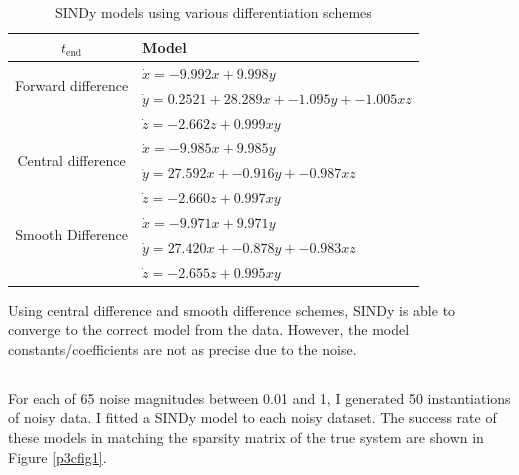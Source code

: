 \documentclass[11pt]{article}
\begin{document}
\subsection{} %

\begin{table}[H]
    \centering
    \caption{SINDy models using various differentiation schemes}
    \label{p3ctab1}
    \begin{tabular}{|c|l|}
        \hline
        $t_{\text{end}}$ & Model \\
        \hline
        \hline
        \multirow{2}{*}{Forward difference} & $\dot{x} = -9.992 x + 9.998 y$ \\
                            & $\dot{y} = 0.252 1 + 28.289 x + -1.095 y + -1.005 x z$ \\
                            & $\dot{z} = -2.662 z + 0.999 x y$ \\
        \hline
        \multirow{2}{*}{Central difference} & $\dot{x} = -9.985 x + 9.985 y$ \\
                            & $\dot{y} = 27.592 x + -0.916 y + -0.987 x z$ \\
                            & $\dot{z} = -2.660 z + 0.997 x y$ \\
        \hline
        \multirow{2}{*}{Smooth Difference} & $\dot{x} = -9.971 x + 9.971 y$ \\
                            & $\dot{y} = 27.420 x + -0.878 y + -0.983 x z$ \\
                            & $\dot{z} = -2.655 z + 0.995 x y$ \\
        \hline
    \end{tabular}
\end{table}

Using central difference and smooth difference schemes, SINDy  is able to converge to the correct model from the data. However, the model constants/coefficients are not as precise due to the noise.

\subsection{} %

For each of 65 noise magnitudes between 0.01 and 1, I generated 50 instantiations of noisy data. I fitted a SINDy model to each noisy dataset. The success rate of these models in matching the sparsity matrix of the true system are shown in Figure \ref{p3cfig1}.
\end{document}
